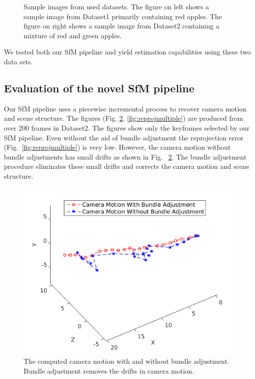 \begin{figure}[!h]
        
        
        
        \caption[Sample images from used datasets.]{Sample images from used datasets. The figure on left shows a sample image from Dataset1 primarily containing red apples. The figure on right shows a sample image from Dataset2 containing a mixture of red and green apples.}\label{fig:datasets_isfm}
\end{figure}





We tested both our SfM pipeline and yield estimation capabilities using these two data sets.
\subsection{Evaluation of the novel SfM pipeline}
\label{subsec:evasfm}
Our SfM pipeline uses a piecewise incremental process to recover camera motion and scene structure. The figures (Fig. \ref{fig:cammotion}, \ref{fig:reprojmultiple}) are produced from over 200 frames in Dataset2. The figures show only the keyframes selected by our SfM pipeline. Even without the aid of bundle adjustment the reprojection error (Fig.~\ref{fig:reprojmultiple}) is very low. However, the camera motion without bundle adjustments has small drifts as shown in Fig. ~\ref{fig:cammotion}. The bundle adjustment procedure eliminates these small drifts and corrects the camera motion and scene structure.

\begin{figure}[!h]
        \centering

        \includegraphics[width=\textwidth]{figures/isfm/CameraMotion.png}
       
 \caption{The computed camera motion with and without bundle adjustment. Bundle adjustment removes the drifts in camera motion.}\label{fig:cammotion}

\end{figure}
        
